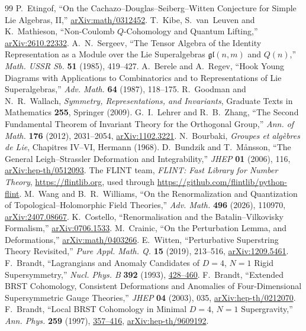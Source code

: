\documentclass[11pt]{article}
\numberwithin{equation}{section}
\numberwithin{figure}{section}
\numberwithin{table}{section}
\begin{document}
\begin{thebibliography}{99}
P.~Etingof, ``On the Cachazo--Douglas--Seiberg--Witten Conjecture for Simple Lie Algebras, II,'' \href{https://arxiv.org/abs/math/0312452}{arXiv:math/0312452}.
T.~Kibe, S.~van~Leuven and K.~Mathieson, ``Non-Coulomb $Q$-Cohomology and Quantum Lifting,'' \href{https://arxiv.org/abs/2610.22332}{arXiv:2610.22332}.
A.~N.~Sergeev, ``The Tensor Algebra of the Identity Representation as a Module over the Lie Superalgebras $\mathfrak{gl}(n,m)$ and $Q(n)$,'' \emph{Math. USSR Sb.} \textbf{51} (1985), 419--427.
A.~Berele and A.~Regev, ``Hook Young Diagrams with Applications to Combinatorics and to Representations of Lie Superalgebras,'' \emph{Adv. Math.} \textbf{64} (1987), 118--175.
R.~Goodman and N.~R.~Wallach, \emph{Symmetry, Representations, and Invariants}, Graduate Texts in Mathematics \textbf{255}, Springer (2009).
G.~I.~Lehrer and R.~B.~Zhang, ``The Second Fundamental Theorem of Invariant Theory for the Orthogonal Group,'' \emph{Ann. of Math.} \textbf{176} (2012), 2031--2054, \href{https://arxiv.org/abs/1102.3221}{arXiv:1102.3221}.
N.~Bourbaki, \emph{Groupes et alg\`ebres de Lie}, Chapitres IV--VI, Hermann (1968).
D.~Bundzik and T.~M{\aa}nsson, ``The General Leigh--Strassler Deformation and Integrability,'' \emph{JHEP} \textbf{01} (2006), 116, \href{https://arxiv.org/abs/hep-th/0512093}{arXiv:hep-th/0512093}.
The FLINT team, \emph{FLINT: Fast Library for Number Theory}, \url{https://flintlib.org}, used through \url{https://github.com/flintlib/python-flint}.
M.~Wang and B.~R.~Williams, ``On the Renormalization and Quantization of Topological--Holomorphic Field Theories,'' \emph{Adv. Math.} \textbf{496} (2026), 110970, \href{https://arxiv.org/abs/2407.08667}{arXiv:2407.08667}.
K.~Costello, ``Renormalisation and the Batalin--Vilkovisky Formalism,'' \href{https://arxiv.org/abs/0706.1533}{arXiv:0706.1533}.
M.~Crainic, ``On the Perturbation Lemma, and Deformations,'' \href{https://arxiv.org/abs/math/0403266}{arXiv:math/0403266}.
E.~Witten, ``Perturbative Superstring Theory Revisited,'' \emph{Pure Appl. Math. Q.} \textbf{15} (2019), 213--516, \href{https://arxiv.org/abs/1209.5461}{arXiv:1209.5461}.
F.~Brandt, ``Lagrangians and Anomaly Candidates of $D=4$, $N=1$ Rigid Supersymmetry,'' \emph{Nucl. Phys. B} \textbf{392} (1993), \href{https://doi.org/10.1016/0550-3213(93)90680-N}{428--460}.
F.~Brandt, ``Extended BRST Cohomology, Consistent Deformations and Anomalies of Four-Dimensional Supersymmetric Gauge Theories,'' \emph{JHEP} \textbf{04} (2003), 035, \href{https://arxiv.org/abs/hep-th/0212070}{arXiv:hep-th/0212070}.
F.~Brandt, ``Local BRST Cohomology in Minimal $D=4$, $N=1$ Supergravity,'' \emph{Ann. Phys.} \textbf{259} (1997), \href{https://doi.org/10.1006/aphy.1997.5709}{357--416}, \href{https://arxiv.org/abs/hep-th/9609192}{arXiv:hep-th/9609192}.
\end{thebibliography}
\end{document}
